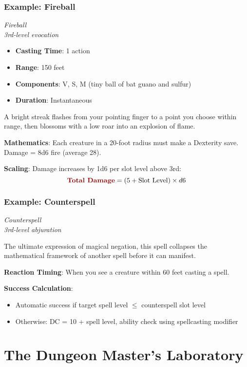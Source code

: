 \documentclass[11pt,letterpaper,openany]{book}
\newcommand{\spell}[1]{\textcolor{mysticblue}{\textit{#1}}}
\newcommand{\damage}[1]{\textcolor{bloodred}{\textbf{#1}}}
\begin{document}
\subsection{Example: Fireball}

\spell{Fireball}\\  
\textit{3rd-level evocation}

\begin{itemize}
    \item \textbf{Casting Time}: 1 action
    \item \textbf{Range}: 150 feet
    \item \textbf{Components}: V, S, M (tiny ball of bat guano and sulfur)
    \item \textbf{Duration}: Instantaneous
\end{itemize}

A bright streak flashes from your pointing finger to a point you choose within range, then blossoms with a low roar into an explosion of flame.

\textbf{Mathematics}: Each creature in a 20-foot radius must make a Dexterity save. Damage = 8d6 fire (average 28).

\textbf{Scaling}: Damage increases by 1d6 per slot level above 3rd:
\begin{equation}
\damage{Total Damage} = (5 + \text{Slot Level}) \times d6
\end{equation}

\subsection{Example: Counterspell}

\spell{Counterspell}\\  
\textit{3rd-level abjuration}

The ultimate expression of magical negation, this spell collapses the mathematical framework of another spell before it can manifest.

\textbf{Reaction Timing}: When you see a creature within 60 feet casting a spell.

\textbf{Success Calculation}:
\begin{itemize}
    \item Automatic success if target spell level $\leq$ counterspell slot level
    \item Otherwise: DC = 10 + spell level, ability check using spellcasting modifier
\end{itemize}

\chapter{The Dungeon Master's Laboratory}
\end{document}
